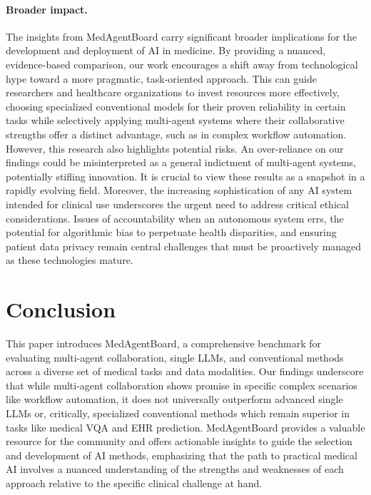 \documentclass{article}
\begin{document}
\paragraph{Broader impact.}
The insights from MedAgentBoard carry significant broader implications for the development and deployment of AI in medicine. By providing a nuanced, evidence-based comparison, our work encourages a shift away from technological hype toward a more pragmatic, task-oriented approach. This can guide researchers and healthcare organizations to invest resources more effectively, choosing specialized conventional models for their proven reliability in certain tasks while selectively applying multi-agent systems where their collaborative strengths offer a distinct advantage, such as in complex workflow automation. However, this research also highlights potential risks. An over-reliance on our findings could be misinterpreted as a general indictment of multi-agent systems, potentially stifling innovation. It is crucial to view these results as a snapshot in a rapidly evolving field. Moreover, the increasing sophistication of any AI system intended for clinical use underscores the urgent need to address critical ethical considerations. Issues of accountability when an autonomous system errs, the potential for algorithmic bias to perpetuate health disparities, and ensuring patient data privacy remain central challenges that must be proactively managed as these technologies mature.

\section{Conclusion}
\label{sec:conclusion}

This paper introduces MedAgentBoard, a comprehensive benchmark for evaluating multi-agent collaboration, single LLMs, and conventional methods across a diverse set of medical tasks and data modalities. Our findings underscore that while multi-agent collaboration shows promise in specific complex scenarios like workflow automation, it does not universally outperform advanced single LLMs or, critically, specialized conventional methods which remain superior in tasks like medical VQA and EHR prediction. MedAgentBoard provides a valuable resource for the community and offers actionable insights to guide the selection and development of AI methods, emphasizing that the path to practical medical AI involves a nuanced understanding of the strengths and weaknesses of each approach relative to the specific clinical challenge at hand.
\end{document}
